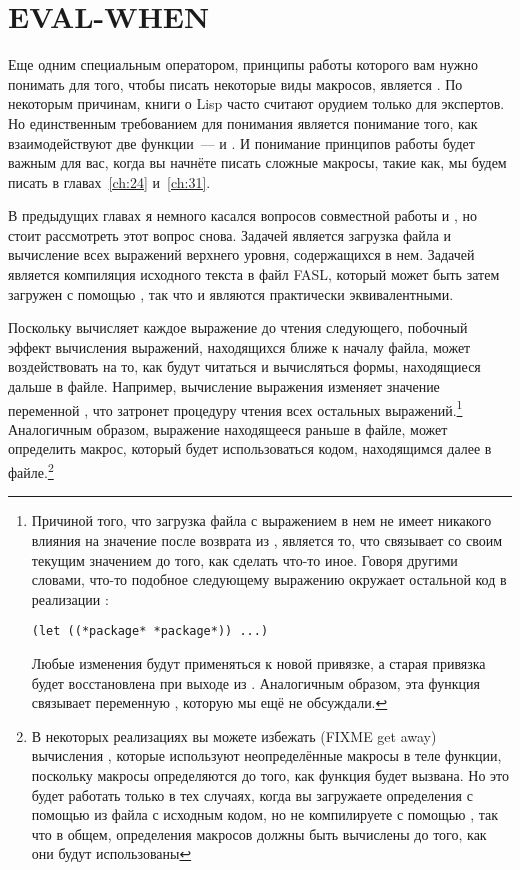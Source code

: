\section{EVAL-WHEN}

Еще одним специальным оператором, принципы работы которого вам нужно понимать для того,
чтобы писать некоторые виды макросов, является .  По некоторым причинам,
книги о Lisp часто считают  орудием только для экспертов.  Но единственным
требованием для понимания  является понимание того, как взаимодействуют
две функции~---  и .  И понимание принципов работы
 будет важным для вас, когда вы начнёте писать сложные макросы, такие как,
мы будем писать в главах~\ref{ch:24} и~\ref{ch:31}.

В предыдущих главах я немного касался вопросов совместной работы  и
, но стоит рассмотреть этот вопрос снова.  Задачей  является
загрузка файла и вычисление всех выражений верхнего уровня, содержащихся в нем.  Задачей
 является компиляция исходного текста в файл FASL, который может быть
затем загружен с помощью , так что  и  являются практически эквивалентными.

Поскольку  вычисляет каждое выражение до чтения следующего, побочный эффект
вычисления выражений, находящихся ближе к началу файла, может воздействовать на то, как
будут читаться и вычисляться формы, находящиеся дальше в файле.  Например, вычисление
выражения  изменяет значение переменной , что затронет
процедуру чтения всех остальных выражений.\footnote{Причиной того, что загрузка файла с
  выражением  в нем не имеет никакого влияния на значение
   после возврата из , является то, что  связывает
   со своим текущим значением до того, как сделать что-то иное.  Говоря
  другими словами, что-то подобное следующему выражению  окружает остальной код
  в реализации :

\begin{lstlisting}
(let ((*package* *package*)) ...)
\end{lstlisting}

Любые изменения  будут применяться к новой привязке, а старая привязка
будет восстановлена при выходе из .  Аналогичным образом, эта функция связывает
переменную , которую мы ещё не обсуждали.}  Аналогичным образом,
выражение  находящееся раньше в файле, может определить макрос, который
будет использоваться кодом, находящимся далее в файле.\footnote{В некоторых реализациях вы
  можете избежать (FIXME get away) вычисления , которые используют
  неопределённые макросы в теле функции, поскольку макросы определяются до того, как
  функция будет вызвана.  Но это будет работать только в тех случаях, когда вы загружаете
  определения с помощью  из файла с исходным кодом, но не компилируете с
  помощью , так что в общем, определения макросов должны быть вычислены
  до того, как они будут использованы}

